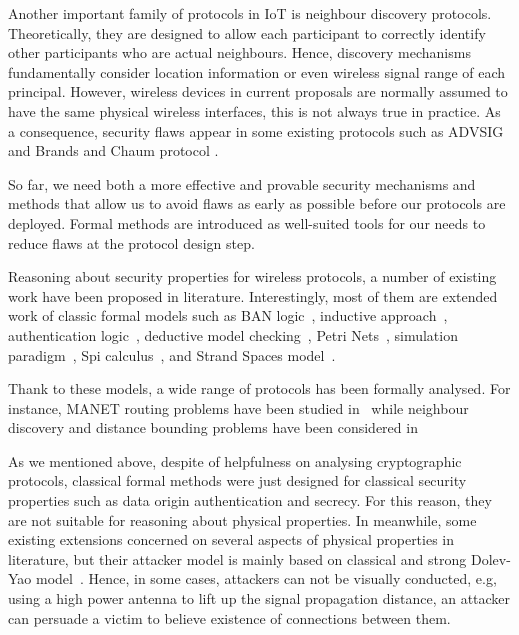 Another important family of protocols in IoT is neighbour discovery protocols. Theoretically, they are designed to allow each participant to correctly identify other participants who are actual neighbours. Hence, discovery mechanisms fundamentally consider location information or even wireless signal range of each principal. However, wireless devices in current proposals are normally assumed to have the same physical wireless interfaces, this is not always true in practice. As a consequence, security flaws appear in some existing protocols such as ADVSIG~\cite{Raffo:2004:ASS:1029102.1029106} and Brands and Chaum protocol \cite{Brands:1994aa}.

So far, we need both a more effective and provable security mechanisms and methods that allow us to avoid flaws as early as possible before our protocols are deployed. Formal methods are introduced as well-suited tools for our needs to reduce flaws at the protocol design step.

Reasoning about security properties for wireless protocols, a number of existing work have been proposed in literature. Interestingly, most of them are extended work of classic formal models such as BAN logic~\cite{Burrows:1990:LA:77648.77649}, inductive approach~\cite{Paulson:1998:IAV:353677.353681}, authentication logic~\cite{Meadows:2007aa}, deductive model checking~\cite{5678752}, Petri Nets~\cite{Peterson:1977:PN:356698.356702}, simulation paradigm~\cite{Acs:2005aa}, Spi calculus~\cite{Abadi:1997:CCP:266420.266432}, and Strand Spaces model~\cite{674832}.

Thank to these models, a wide range of protocols has been formally analysed. For instance, MANET routing problems have been studied in~\cite{4678548, Jensen:1995:CPN:216127, 1286194, Acs:2005aa, 4428765, Acs:2006:MAS:1180345.1180352, Yang03modelingvulnerabilities, 4481351,Li:2007:ESS:1338438.1338469} while neighbour discovery and distance bounding problems have been considered in ~\cite{RaphaelJamet, SrdjanCapkun2006,Crazzolara:2001:PNC:645609.662336, Basin:2009:LGP:1616077.1616079, Sharp:2007:TTS:2391910.2391948, Meadows:2007aa}

As we mentioned above, despite of helpfulness on analysing cryptographic protocols, classical formal methods were just designed for classical security properties such as data origin authentication and secrecy. For this reason, they are not suitable for reasoning about physical properties. In meanwhile, some existing extensions concerned on several aspects of physical properties in literature, but their attacker model is mainly based on classical and strong Dolev-Yao model~\cite{dolev-yao}. Hence, in some cases, attackers can not be visually conducted, e.g, using a high power antenna to lift up the signal propagation distance, an attacker can persuade a victim to believe existence of connections between them. 

